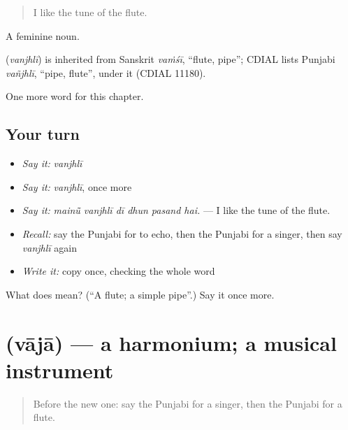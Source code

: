 \begin{quote}
I like the tune of the flute.
\end{quote}

A feminine noun.

\begin{cousinweb}
\textbf{} (\emph{vanjhlī}) is inherited from Sanskrit \emph{vaṁśī}, \textquotedblleft{}flute, pipe\textquotedblright{}; CDIAL lists Punjabi \emph{vañjhlī}, \textquotedblleft{}pipe, flute\textquotedblright{}, under it (CDIAL 11180).
\end{cousinweb}

\begin{grammarlens}[title={What you've built}]
One more word for this chapter.
\end{grammarlens}

\subsection*{Your turn}
\begin{itemize}
\raggedright
  \item \emph{Say it:} \emph{vanjhlī}
  \item \emph{Say it:} \emph{vanjhlī}, once more
  \item \emph{Say it:} \emph{mainū̃ vanjhlī dī dhun pasand hai.} — I like the tune of the flute.
  \item \emph{Recall:} say the Punjabi for to echo, then the Punjabi for a singer, then say \emph{vanjhlī} again
  \item \emph{Write it:} copy \textbf{} once, checking the whole word
\end{itemize}

\begin{tcolorbox}[breakable,colback=teal!4,colframe=teal!35!black,title={Before you move on}]
What does  mean? (\textquotedblleft{}A flute; a simple pipe\textquotedblright{}.) Say it once more.
\end{tcolorbox}
\section[\texorpdfstring{\pa{ਵਾਜਾ} (vājā)}{ਵਾਜਾ (vājā)}]{ (vājā) — a harmonium; a musical instrument}

\label{lesson:PA-C349-vaja}



\begin{quote}
Before the new one: say the Punjabi for a singer, then the Punjabi for a flute.
\end{quote}


